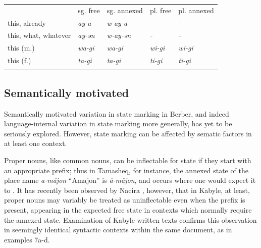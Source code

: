 \documentclass[output=paper]{langscibook}
\begin{document}
\begin{styleLangsciTableHeading}%
\begin{table}
\caption{Selected demonstrative/relative/support pronouns in Kabyle \citep{Dallet1982}}
\label{tab:key:8}
\end{table}\end{styleLangsciTableHeading}


\begin{tabularx}{\textwidth}{XXXXX}
 & sg. free & sg. annexed & pl. free & pl. annexed\\
\lsptoprule
this, already & \textit{ay-a} & \textit{w-ay-a} & \textit{{}-} & \textit{{}-}\\
this, what, whatever & \textit{ay-ən} & \textit{w-ay-ən} & \textit{{}-} & \textit{{}-}\\
this (m.) & \textit{wa-gi} & \textit{wa-gi} & \textit{wi-gi} & \textit{wi-gi}\\
this (f.) & \textit{ta-gi} & \textit{ta-gi} & \textit{ti-gi} & \textit{ti-gi}\\
\lspbottomrule
\end{tabularx}
\subsection{Semantically motivated} %
\begin{styleStandarduser}
Semantically motivated variation in state marking in Berber, and indeed language-internal variation in state marking more generally, has yet to be seriously explored. However, state marking can be affected by sematic factors in at least one context.
\end{styleStandarduser}

\begin{styleStandarduser}
Proper nouns, like common nouns, can be inflectable for state if they start with an appropriate prefix; thus in Tamasheq, for instance, the annexed state of the place name \textit{a-măjon} “Amajon” is \textit{ă-măjon}, and occurs where one would expect it to \citep[40]{Heath2005b}. It has recently been observed by Nacira \citet{Abrous2023}, however, that in Kabyle, at least, proper nouns may variably be treated as uninflectable even when the prefix is present, appearing in the expected free state in contexts which normally require the annexed state. Examination of Kabyle written texts confirms this observation in seemingly identical syntactic contexts within the same document, as in examples 7a-d.
\end{styleStandarduser}
\end{document}
